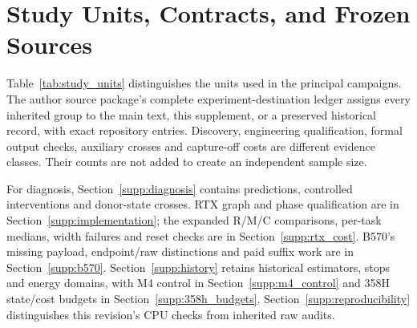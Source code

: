 \section{Study Units, Contracts, and Frozen Sources}
\label{supp:scope}
Table~\ref{tab:study_units} distinguishes the units used in the principal campaigns. The author source package's complete experiment-destination ledger assigns every inherited group to the main text, this supplement, or a preserved historical record, with exact repository entries. Discovery, engineering qualification, formal output checks, auxiliary crosses and capture-off costs are different evidence classes. Their counts are not added to create an independent sample size.

For diagnosis, Section~\ref{supp:diagnosis} contains predictions, controlled interventions and donor-state crosses. RTX graph and phase qualification are in Section~\ref{supp:implementation}; the expanded R/M/C comparisons, per-task medians, width failures and reset checks are in Section~\ref{supp:rtx_cost}. B570's missing payload, endpoint/raw distinctions and paid suffix work are in Section~\ref{supp:b570}. Section~\ref{supp:history} retains historical estimators, stops and energy domains, with M4 control in Section~\ref{supp:m4_control} and 358H state/cost budgets in Section~\ref{supp:358h_budgets}. Section~\ref{supp:reproducibility} distinguishes this revision's CPU checks from inherited raw audits.

